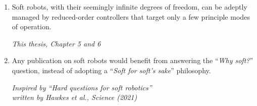 \documentclass[a5paper]{article}
\begin{document}
\begin{enumerate}

  \item Soft robots, with their seemingly infinite degrees of freedom, can be adeptly managed by reduced-order controllers that target only a few principle modes of operation.%
  \begin{flushright}
  \vspace{-5mm}
  \textit{\small This thesis, Chapter 5 and 6}
  \vspace{-1mm}
  \end{flushright}

  \item Any publication on soft robots would benefit from answering the ``\textit{Why soft?}'' question, instead of adopting a ``\textit{Soft for soft's sake}'' philosophy. 
  \begin{flushright}
  \vspace{-2mm}
  \textit{Inspired by ``Hard questions for soft robotics'' \\ written by Hawkes et al., Science (2021)}
  \vspace{-1mm}
  \end{flushright}  


\end{enumerate}
\end{document}
